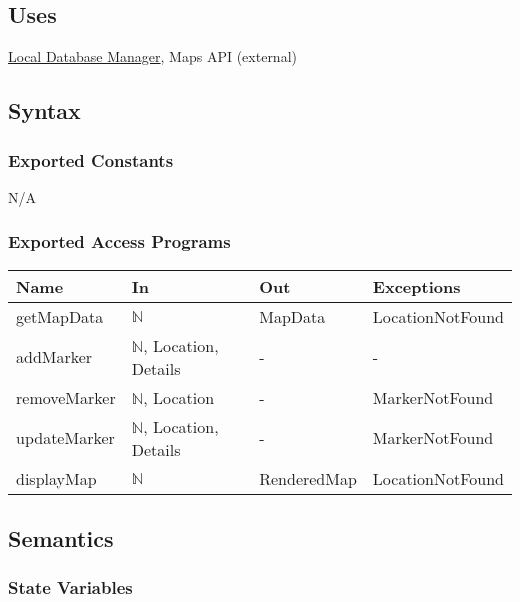 \documentclass[12pt, titlepage]{article}
\begin{document}
\subsection{Uses}

\hyperref[local-dbm]{Local Database Manager}, Maps API (external)

\subsection{Syntax}

\subsubsection{Exported Constants}

N/A

\subsubsection{Exported Access Programs}

\begin{center}
  \begin{tabular}{p{4cm} p{3cm} p{3cm} p{4cm}}
    \hline
    \textbf{Name} & \textbf{In}                     & \textbf{Out} & \textbf{Exceptions} \\
    \hline
    getMapData    & $\mathbb{N}$                    & MapData      & LocationNotFound    \\
    addMarker     & $\mathbb{N}$, Location, Details & -            & -                   \\
    removeMarker  & $\mathbb{N}$, Location          & -            & MarkerNotFound      \\
    updateMarker  & $\mathbb{N}$, Location, Details & -            & MarkerNotFound      \\
    displayMap    & $\mathbb{N}$                    & RenderedMap  & LocationNotFound    \\
    \hline
  \end{tabular}
\end{center}

\subsection{Semantics}

\subsubsection{State Variables}
\end{document}
